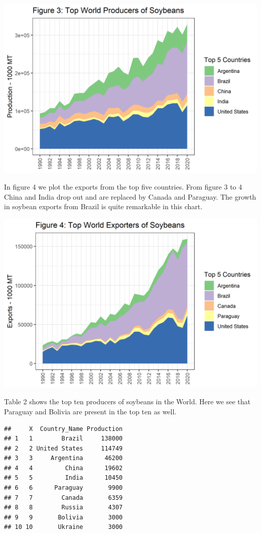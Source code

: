 \documentclass[
]{book}
\begin{document}
\includegraphics{assets/SouthAmericanProd_TopProdSoy.png}

In figure 4 we plot the exports from the top five countries. From figure 3 to 4 China and India drop out and are replaced by Canada and Paraguay. The growth in soybean exports from Brazil is quite remarkable in this chart.

\includegraphics{assets/SouthAmericanProd_TopExporterSoy.png}

Table 2 shows the top ten producers of soybeans in the World. Here we see that Paraguay and Bolivia are present in the top ten as well.

\begin{verbatim}
##     X  Country_Name Production
## 1   1        Brazil     138000
## 2   2 United States     114749
## 3   3     Argentina      46200
## 4   4         China      19602
## 5   5         India      10450
## 6   6      Paraguay       9900
## 7   7        Canada       6359
## 8   8        Russia       4307
## 9   9       Bolivia       3000
## 10 10       Ukraine       3000
\end{verbatim}
\end{document}
